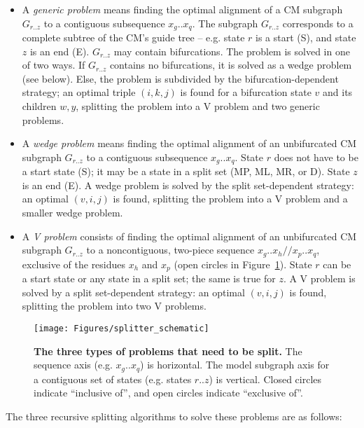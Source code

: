 \documentclass[11pt]{article}
\begin{document}
\begin{itemize}
\item A \emph{generic problem} means finding the optimal alignment of
a CM subgraph $G_{r..z}$ to a contiguous subsequence $x_g..x_q$. The
subgraph $G_{r..z}$ corresponds to a complete subtree of the CM's
guide tree -- e.g. state $r$ is a start (S), and state $z$ is an end
(E). $G_{r..z}$ may contain bifurcations. The problem is solved in one
of two ways. If $G_{r..z}$ contains no bifurcations, it is solved as a
wedge problem (see below). Else, the problem is subdivided by the
bifurcation-dependent strategy; an optimal triple $(i,k,j)$ is found
for a bifurcation state $v$ and its children $w,y$, splitting the
problem into a V problem and two generic problems.

\item A \emph{wedge problem} means finding the optimal alignment of an
unbifurcated CM subgraph $G_{r..z}$ to a contiguous subsequence
$x_g..x_q$. State $r$ does not have to be a start state (S); it may be
a state in a split set (MP, ML, MR, or D). State $z$ is an end (E).  A
wedge problem is solved by the split set-dependent strategy: an
optimal $(v,i,j)$ is found, splitting the problem into a V problem and
a smaller wedge problem.

\item A \emph{V problem} consists of finding the optimal alignment of
an unbifurcated CM subgraph $G_{r..z}$ to a noncontiguous, two-piece
sequence $x_g..x_h//x_p..x_q$, exclusive of the residues $x_h$ and
$x_p$ (open circles in Figure~\ref{fig:splitter_schematic}).  State
$r$ can be a start state or any state in a split set; the same is true
for $z$. A V problem is solved by a split set-dependent strategy: an
optimal $(v,i,j)$ is found, splitting the problem into two V problems.
\end{itemize}

\begin{figure}
\begin{center}
\texttt{[image: Figures/splitter\_schematic]}
\end{center}
\caption{\textbf{The three types of problems that need to be split.}
The sequence axis (e.g. $x_g..x_q$) is horizontal. The model subgraph
axis for a contiguous set of states (e.g. states $r..z$) is vertical.
Closed circles indicate ``inclusive of'', and open circles indicate
``exclusive of''.}
\label{fig:splitter_schematic}
\end{figure}

The three recursive splitting algorithms to solve these problems
are as follows:
\end{document}
